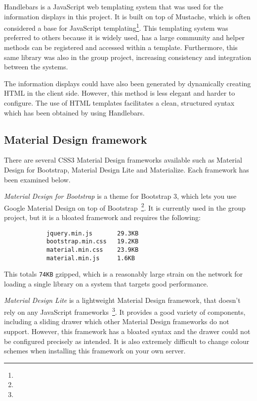 {{		Handlebars is a JavaScript web templating system that was used for the information displays in this project. It is built on top of Mustache, which is often considered a base for JavaScript templating\footnote{}. This templating system was preferred to others because it is widely used, has a large community and helper methods can be registered and accessed within a template. Furthermore, this same library was also in the group project, increasing consistency and integration between the systems.

		The information displays could have also been generated by dynamically creating HTML in the client side. However, this method is less elegant and harder to configure. The use of HTML templates facilitates a clean, structured syntax which has been obtained by using Handlebars.

	}

	\subsection{Material Design framework} {
	\label{sec:material_design_framework}

		There are several CSS3 Material Design frameworks available such as Material Design for Bootstrap, Material Design Lite and Materialize. Each framework has been examined below.

		\emph{Material Design for Bootstrap} is a theme for Bootstrap 3, which lets you use Google Material Design on top of Bootstrap~\footnote{}. It is currently used in the group project, but it is a bloated framework and requires the following:

		\begin{verbatim}
			jquery.min.js 		29.3KB
			bootstrap.min.css 	19.2KB 
			material.min.css 	23.9KB
			material.min.js 	1.6KB
		\end{verbatim}

		This totals \texttt{74KB} gzipped, which is a reasonably large strain on the network for loading a single library on a system that targets good performance.
		
		\emph{Material Design Lite} is a lightweight Material Design framework, that doesn't rely on any JavaScript frameworks~\footnote{}. It provides a good variety of components, including a sliding drawer which other Material Design frameworks do not support. However, this framework has a bloated syntax and the drawer could not be configured precisely as intended. It is also extremely difficult to change colour schemes when installing this framework on your own server.

}}
